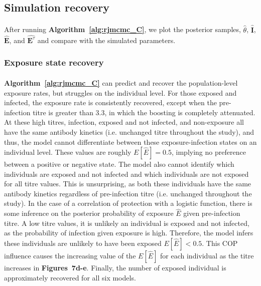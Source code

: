 \subsection{Simulation recovery }
\paragraph{}After running \textbf{Algorithm~\ref{alg:rjmcmc_C}}, we plot the posterior samples, $\hat{\theta}$, $\hat{\mathbf{I}}$,  $\hat{\mathbf{E}}$, and  $\hat{\mathbf{E}^\tau}$ and compare with the simulated parameters.

\subsubsection{Exposure state recovery}
\paragraph{} \textbf{Algorithm~\ref{alg:rjmcmc_C}} can predict and recover the population-level exposure rates, but struggles on the individual level. For those exposed and infected, the exposure rate is consistently recovered, except when the pre-infection titre is greater than 3.3, in which the boosting is completely attenuated. At these high titres, infection, exposed and not infected, and non-exposure all have the same antibody kinetics (i.e. unchanged titre throughout the study), and thus, the model cannot differentiate between these exposure-infection states on an individual level. These values are roughly $E[\hat{E}] = 0.5$, implying no preference between a positive or negative state. The model also cannot identify which individuals are exposed and not infected and which individuals are not exposed for all titre values. This is unsurprising, as both these individuals have the same antibody kinetics regardless of pre-infection titre (i.e. unchanged throughout the study). In the case of a correlation of protection with a logistic function, there is some inference on the posterior probability of exposure $\hat{E}$ given pre-infection titre. A low titre values, it is unlikely an individual is exposed and not infected, as the probability of infection given exposure is high. Therefore, the model infers these individuals are unlikely to have been exposed $E[\hat{E}] < 0.5$. This COP influence causes the increasing value of the $E[\hat{E}]$ for each individual as the titre increases in \textbf{Figures~7d-e}. Finally, the number of exposed individual is approximately recovered for all six models. 

